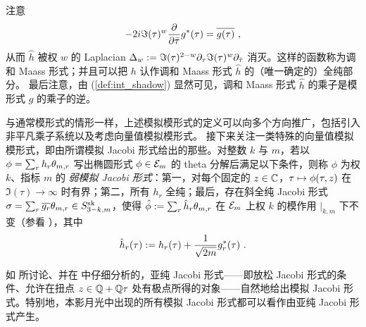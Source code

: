 注意
\begin{gather}\label{eqn:jac:mck-partialgstargbar}
-2i\Im(\tau)^w\frac{\partial}{\partial \bar \tau} g^\ast(\tau) =  
\overline{g(\tau)}~, 
\end{gather}
从而 $\hat h$ 被权 $w$ 的 Laplacian $\Delta_w := \Im(\tau)^{2-w} \partial_\tau \Im(\tau)^w \partial_{\bar{\tau}}$ 消灭。这样的函数称为调和 Maass 形式；并且可以把 $h$ 认作调和 Maass 形式 $\hat h$ 的（唯一确定的）全纯部分。
最后注意，由 (\ref{def:int_shadow}) 显然可见，调和 Maass 形式 $\hat h$ 的乘子是模形式 $g$ 的乘子的逆。


与通常模形式的情形一样，上述模拟模形式的定义可以向多个方向推广，包括引入非平凡乘子系统以及考虑向量值模拟模形式。
接下来关注一类特殊的向量值模拟模形式，即由所谓模拟 Jacobi 形式给出的那些。对整数 $k$ 与 $m$，若以 $\phi=\sum_r {h}_r\theta_{m,r}$ 写出椭圆形式 $\phi\in\mathcal{E}_m$ 的 theta 分解后满足以下条件，则称 $\phi$ 为权 $k$、指标 $m$ 的 {\em 弱模拟 Jacobi 形式}：第一，对每个固定的 $z\in\mathbb{C}$，$\tau\mapsto \phi(\tau,z)$ 在 $\Im(\tau)\to \infty$ 时有界；第二，所有 $h_r$ 全纯；最后，存在斜全纯 Jacobi 形式 $\sigma=\sum_r \overline{g_r}\theta_{m,r}\in S^{\rm sk}_{3-k,m}$，使得 $\hat\phi:=\sum_r\hat{h}_r\theta_{m,r}$ 在 $\mathcal{E}_m$ 上权 $k$ 的模作用 $\lvert_{k,m}$ 下不变（参看 ），其中
\begin{gather}\label{eqn:jac:mck-hhat}
\hat{h}_r(\tau):=h_r(\tau)+\frac1{\sqrt{2m}}g_r^*(\tau)~. 
\end{gather}


如 \cite{Zwegers2008} 所讨论、并在 \cite{Dabholkar:2012nd,umstar} 中仔细分析的，亚纯 Jacobi 形式——即放松 Jacobi 形式的条件、允许在扭点 $z\in \mathbb{Q} + \mathbb{Q} \tau $ 处有极点所得的对象——自然地给出模拟 Jacobi 形式。特别地，本影月光中出现的所有模拟 Jacobi 形式都可以看作由亚纯 Jacobi 形式产生。


